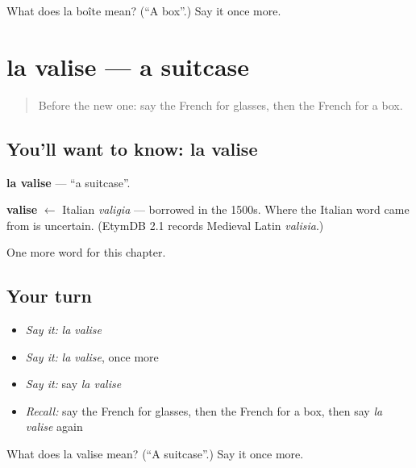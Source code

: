 \begin{tcolorbox}[breakable,colback=teal!4,colframe=teal!35!black,title={Before you move on}]
What does la boîte mean? (\textquotedblleft{}A box\textquotedblright{}.) Say it once more.
\end{tcolorbox}
\section[la valise]{la valise — a suitcase}

\label{lesson:FR-C80-valise}



\begin{quote}
Before the new one: say the French for glasses, then the French for a box.
\end{quote}

\subsection*{You'll want to know: la valise}
\textbf{la valise} — \textquotedblleft{}a suitcase\textquotedblright{}.

\begin{cousinweb}
\textbf{valise} $\leftarrow$ Italian \emph{valigia} — borrowed in the 1500s. Where the Italian word came from is uncertain. (EtymDB 2.1 records Medieval Latin \emph{valisia}.)
\end{cousinweb}

\begin{grammarlens}[title={What you've built}]
One more word for this chapter.
\end{grammarlens}

\subsection*{Your turn}
\begin{itemize}
\raggedright
  \item \emph{Say it:} \emph{la valise}
  \item \emph{Say it:} \emph{la valise}, once more
  \item \emph{Say it:} say \emph{la valise}
  \item \emph{Recall:} say the French for glasses, then the French for a box, then say \emph{la valise} again
\end{itemize}

\begin{tcolorbox}[breakable,colback=teal!4,colframe=teal!35!black,title={Before you move on}]
What does la valise mean? (\textquotedblleft{}A suitcase\textquotedblright{}.) Say it once more.
\end{tcolorbox}
